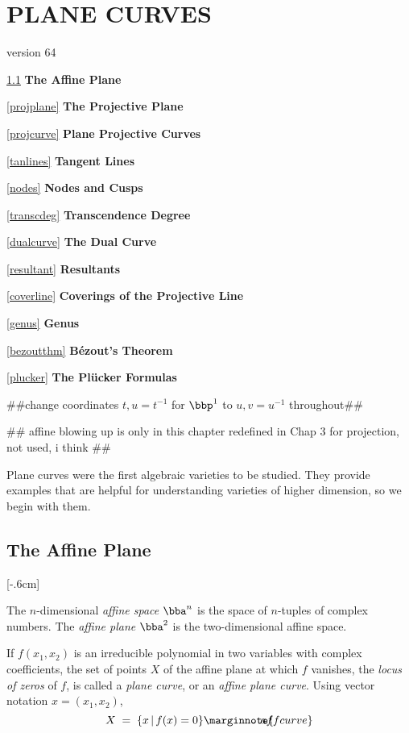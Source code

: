 \documentclass[leqno]{book}
\newcommand\Marginnote[1]{\marginnote{\hspace{-12pt}\normalfont{#1}}}
\theoremstyle{definition}%
\numberwithin{equation}{section}
\theoremstyle{theorem} %
\begin{document}
\chapter{PLANE CURVES} \label{planecurves}
 
\no
version 64
\no


	\ref{affineplane}  \;  {\bf The Affine Plane}  
	
	\ref{projplane} \;  {\bf The Projective Plane} 

        \ref{projcurve} \; {\bf Plane Projective Curves} 

	\ref{tanlines} \;  {\bf Tangent Lines} 
	
	\ref{nodes} \; {\bf  Nodes and Cusps} 
	
	\ref{transcdeg} \;  {\bf Transcendence Degree}
	
	\ref{dualcurve} \;  {\bf  The Dual Curve}

	\ref{resultant} \;  {\bf Resultants}
	
	\ref{coverline} \; {\bf  Coverings of the Projective Line}
	
	\ref{genus} \;  {\bf Genus}

	\ref{bezoutthm} \;  {\bf B\'ezout's Theorem} 

       \ref{plucker}  \; {\bf The Pl\"ucker Formulas}

\ms \#\#change coordinates $t,u=t^{-1}$ for $\bbp^1$ to $u,v=u^{-1}$
throughout\#\#

\#\# affine blowing up is only in this chapter
redefined in Chap 3 for projection, not used, i think
\#\#

\bsno Plane curves were the first algebraic varieties to be studied.
They provide examples that are helpful for understanding varieties
of higher dimension, so we begin with them.


\section{The Affine  Plane} 
\label{affineplane} \Marginnote{affineplane}[-.6cm]

\msno The
$n$-dimensional {\it affine space} $\bba^n$ is the space of
$n$-tuples of complex numbers.  The
{\it affine plane} $\bba^2$ is the two-dimensional affine space.


If $f(x_1,x_2)$ is an irreducible polynomial in two variables with
complex coefficients, the set of points $X$ of the affine plane at
which $f$ vanishes, the {\it locus of zeros} of $f$, is called a {\it plane
curve}, or an {\it affine plane curve}.  Using vector notation
  $x=(x_1,x_2)$,
\begin{equation}
X \;=\; \{x \,|\, f(x)=0\}  \Marginnote{affcurve}
	\label{affcurve}
\end{equation}
 
\end{document}
